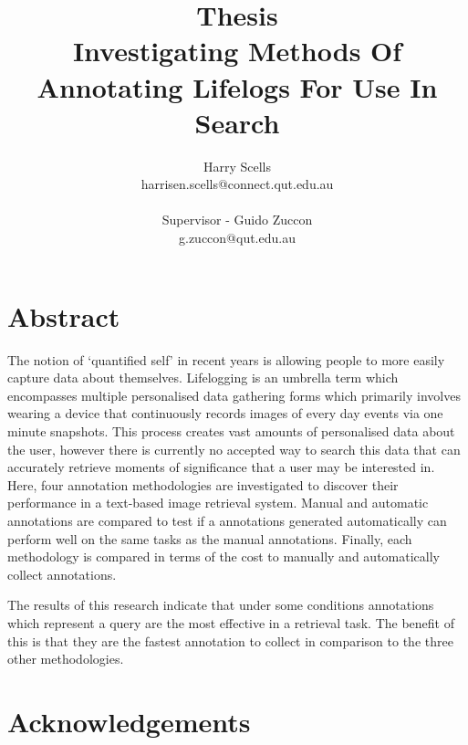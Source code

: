 \documentclass[12pt,a4paper]{book}
\begin{document}
\title{\small Thesis\\\huge Investigating Methods Of Annotating Lifelogs For Use In Search}

\author{Harry Scells\\harrisen.scells@connect.qut.edu.au\\\\\small Supervisor - Guido Zuccon\\\small g.zuccon@qut.edu.au\\}
\maketitle

\chapter*{Abstract}
The notion of `quantified self' in recent years is allowing people to more easily capture data about themselves. Lifelogging is an umbrella term which encompasses multiple personalised data gathering forms which primarily involves wearing a device that continuously records images of every day events via one minute snapshots. This process creates vast amounts of personalised data about the user, however there is currently no accepted way to search this data that can accurately retrieve moments of significance that a user may be interested in. Here, four annotation methodologies are investigated to discover their performance in a text-based image retrieval system. Manual and automatic annotations are compared to test if a annotations generated automatically can perform well on the same tasks as the manual annotations. Finally, each methodology is compared in terms of the cost to manually and automatically collect annotations.

The results of this research indicate that under some conditions annotations which represent a query are the most effective in a retrieval task. The benefit of this is that they are the fastest annotation to collect in comparison to the three other methodologies.

\chapter*{Acknowledgements}

\tableofcontents











\end{document}

